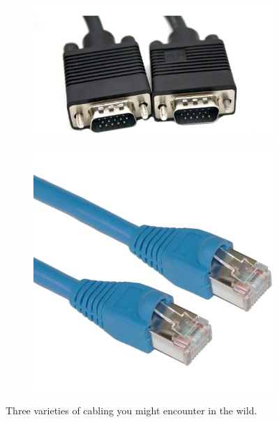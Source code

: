 \documentclass{scrartcl}
\begin{document}
\begin{figure}[h]
\begin{subfigure}[t]{0.25\textwidth}
        \label{subfig:minidisplay}
    \end{subfigure}%
    \hfill
    \begin{subfigure}[t]{0.25\textwidth}
        \centering
        \includegraphics[width=\textwidth]{img/vga}
        \label{subfig:vga}
    \end{subfigure}%
    \hfill
    \begin{subfigure}[t]{0.25\textwidth}
        \centering
        \includegraphics[width=\textwidth]{img/ethernet}
        \label{subfig:ethernet}
    \end{subfigure}%
    \caption{Three varieties of cabling you might encounter in the wild.}
    \label{fig:cables}
\end{figure}
\end{document}
